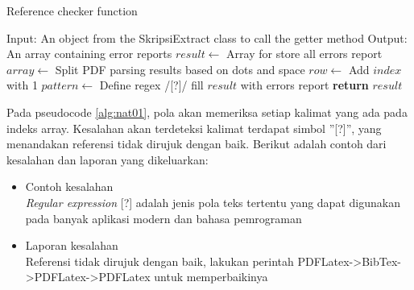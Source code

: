 \begin{enumerate}
\begin{minipage}{1.0\linewidth}
\begin{algorithm}[H]
    \caption{Reference checker function}
	\label{alg:nat01}
	\begin{algorithmic}[1]
    		\State Input: An object from the SkripsiExtract class to call the getter method
			\State Output: An array containing error reports
			\State $result \gets$ Array for store all errors report
			\State $array \gets$ Split PDF parsing results based on dots and space
    			\State $row \gets$ Add $index$ with 1
				\State $pattern \gets$ Define regex /[?]/
                	\State fill $result$ with errors report
            	\EndIf
        	\EndFor
    		\State \textbf{return} $result$
    	\EndFunction
	\end{algorithmic}
\end{algorithm}
\end{minipage}
\medskip

	Pada pseudocode \ref{alg:nat01}, pola akan memeriksa setiap kalimat yang ada pada indeks array. Kesalahan akan terdeteksi kalimat terdapat simbol ''[?]'', yang menandakan referensi tidak dirujuk dengan baik. Berikut adalah contoh dari kesalahan dan laporan yang dikeluarkan:
	
	\begin{itemize}
		\item Contoh kesalahan \\
		\textit{Regular expression} [?] adalah jenis pola teks tertentu yang dapat digunakan pada banyak aplikasi modern dan bahasa pemrograman
		\item Laporan kesalahan \\
		Referensi tidak dirujuk dengan baik, lakukan perintah PDFLatex->BibTex->PDFLatex->PDFLatex untuk memperbaikinya
	\end{itemize}		
	
\end{enumerate}